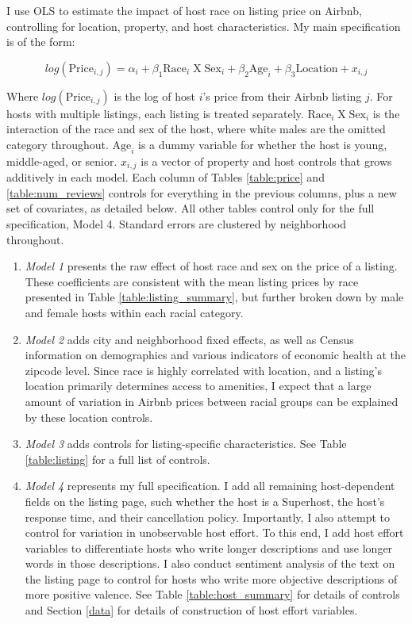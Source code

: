 
I use OLS to estimate the impact of host race on listing price on Airbnb, controlling for location, property, and host characteristics. My main specification is of the form:

\[ log(\text{Price}_{i,j}) = \alpha_i + \beta_1 \text{Race}_{i} \;  \text{X} \; \text{Sex}_i + \beta_2 \text{Age}_i + \beta_3 \text{Location} +  x_{i,j} \]

Where $log(\text{Price}_{i,j})$ is the log of host $i$'s price from their Airbnb listing $j$. For hosts with multiple listings, each listing is treated separately. $\text{Race}_{i} \;  \text{X} \; \text{Sex}_i$ is the interaction of the race and sex of the host, where white males are the omitted category throughout. $\text{Age}_i$ is a dummy variable for whether the host is young, middle-aged, or senior. $x_{i,j}$ is a vector of property and host controls that grows additively in each model. Each column of Tables \ref{table:price} and \ref{table:num_reviews} controls for everything in the previous columns, plus a new set of covariates, as detailed below. All other tables control only for the full specification, Model 4. Standard errors are clustered by neighborhood throughout.

\begin{enumerate}
	\item \textit{Model 1} presents the raw effect of host race and sex on the price of a listing. These coefficients are consistent with the mean listing prices by race presented in Table \ref{table:listing_summary}, but further broken down by male and female hosts within each racial category.
	
	\item \textit{Model 2} adds city and neighborhood fixed effects, as well as Census information on demographics and various indicators of economic health at the zipcode level. Since race is highly correlated with location, and a listing's location primarily determines access to amenities, I expect that a large amount of variation in Airbnb prices between racial groups can be explained by these location controls.
	
	\item \textit{Model 3} adds controls for listing-specific characteristics. See Table \ref{table:listing} for a full list of controls. 
	
	\item \textit{Model 4} represents my full specification. I add all remaining host-dependent fields on the listing page, such whether the host is a Superhost, the host's response time, and their cancellation policy. Importantly, I also attempt to control for variation in unobservable host effort. To this end, I add host effort variables to differentiate hosts who write longer descriptions and use longer words in those descriptions. I also conduct sentiment analysis of the text on the listing page to control for hosts who write more objective descriptions of more positive valence. See Table \ref{table:host_summary} for details of controls and Section \ref{data} for details of construction of host effort variables. 
\end{enumerate}




